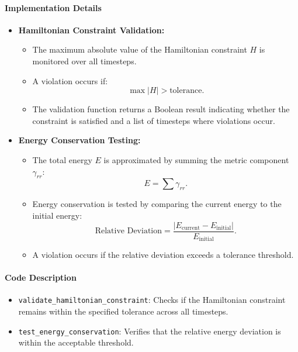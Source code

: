 \documentclass[12pt]{article}
\begin{document}
\paragraph{Implementation Details}
\begin{itemize}
    \item \textbf{Hamiltonian Constraint Validation:}
    \begin{itemize}
        \item The maximum absolute value of the Hamiltonian constraint $H$ is monitored over all timesteps.
        \item A violation occurs if:
        \[
        \max |H| > \text{tolerance}.
        \]
        \item The validation function returns a Boolean result indicating whether the constraint is satisfied and a list of timesteps where violations occur.
    \end{itemize}
    \item \textbf{Energy Conservation Testing:}
    \begin{itemize}
        \item The total energy $E$ is approximated by summing the metric component $\gamma_{rr}$:
        \[
        E = \sum \gamma_{rr}.
        \]
        \item Energy conservation is tested by comparing the current energy to the initial energy:
        \[
        \text{Relative Deviation} = \frac{|E_{\text{current}} - E_{\text{initial}}|}{E_{\text{initial}}}.
        \]
        \item A violation occurs if the relative deviation exceeds a tolerance threshold.
    \end{itemize}
\end{itemize}

\paragraph{Code Description}
\begin{itemize}
    \item \texttt{validate\_hamiltonian\_constraint}: Checks if the Hamiltonian constraint remains within the specified tolerance across all timesteps.
    \item \texttt{test\_energy\_conservation}: Verifies that the relative energy deviation is within the acceptable threshold.
\end{itemize}
\end{document}
